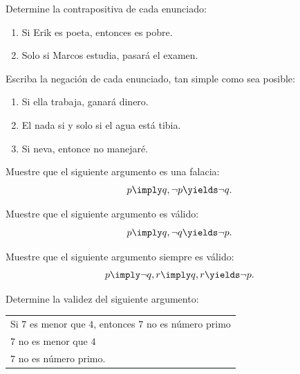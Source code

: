  \begin{problema}
  Determine la contrapositiva de cada enunciado:
  \begin{enumerate}
   \item Si Erik es poeta, entonces es pobre. 
   \item Solo si Marcos estudia, pasará el examen. 
  \end{enumerate}

 \end{problema}




 \begin{problema}
  Escriba la negación de cada enunciado, tan simple como sea posible:
  \begin{enumerate}
   \item Si ella trabaja, ganará dinero. 
   \item El nada si y solo si el agua está tibia. 
   \item Si neva, entonce no manejar\'e.
  \end{enumerate}

 \end{problema}





 \begin{problema}
  Muestre que el siguiente argumento es una falacia:
 $$
 p\imply q, \neg p \yields \neg q.
 $$
 \end{problema}




 \begin{problema}
  Muestre que el siguiente argumento es válido:
 $$
 p\imply q, \neg q \yields \neg p.
 $$
 \end{problema}




\begin{problema}
  Muestre que el siguiente argumento siempre es válido:
 $$
 p \imply \neg q, r \imply q, r \yields \neg p.
 $$
\end{problema}




 \begin{problema}
  Determine la validez del siguiente argumento:
  \begin{center}
\begin{tabular}{l}
Si $7$ es menor que $4$, entonces $7$ no es número primo\\
$7$ no es menor que $4$\\\hline
$7$ no es número primo.
  \end{tabular}
  \end{center}

 \end{problema}




